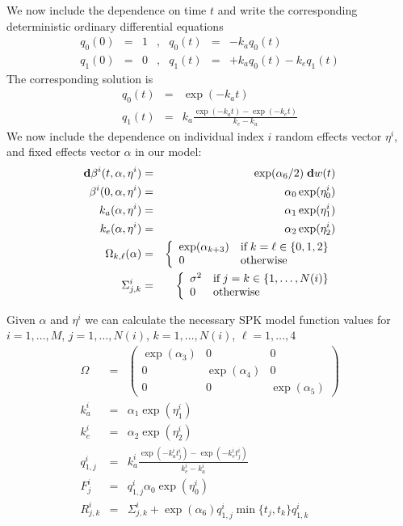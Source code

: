 \documentclass{article}
\newcommand{\Bd}{{\bf d}}
\begin{document}
\bigskip
\noindent
We now include the dependence on time \( t \) and write
the corresponding deterministic ordinary differential equations
\[
\begin{array}{rclcrcl}
q_0 (0) & = & 1 & , & q_0 (t) & = & -k_a q_0 (t) 
\\ 
q_1 (0) & = & 0   & ,  & q_1 (t) & = & +k_a q_0 (t) - k_e q_1 (t) 
\end{array}
\]
The corresponding solution is
\begin{eqnarray*}
q_0 (t)   & = & \exp( - k_a t ) \\
q_1 (t)   & = & k_a \frac{ \exp( - k_a t ) - \exp( -k_e t ) }{ k_e - k_a }
\end{eqnarray*}
We now include the dependence on individual index \( i \)
random effects vector \( \eta^i \),
and fixed effects vector \( \alpha \) in our model:
\begin{eqnarray*}
\Bd \beta^i (t, \alpha, \eta^i ) & = & 
	\exp( \alpha_6 / 2 ) \; \Bd w (t)  
\\
\beta^i (0, \alpha, \eta^i ) & = & 
	\alpha_0 \exp( \eta^i_0 )   
\\
k_a ( \alpha , \eta^i ) & = & 
	\alpha_1 \exp( \eta^i_1 ) 
\\
k_e ( \alpha , \eta^i ) & = & 
	\alpha_2 \exp( \eta^i_2 ) 
\\
\Omega_{k, \ell} ( \alpha ) & = & \left\{ \begin{array}{ll}
	\exp( \alpha_{k + 3} ) & \mbox{if} \; k = \ell \in \{ 0 , 1 , 2 \} 
	\\
	0                      & \mbox{otherwise}
\end{array} \right.
\\
\Sigma^i_{j, k} & = & \left\{ \begin{array}{ll}
	\sigma^2 & \mbox{if} \; j = k \in \{ 1 , \ldots , N(i) \} 
	\\
	0                      & \mbox{otherwise}
\end{array} \right.
\end{eqnarray*}

\bigskip
\noindent
Given \( \alpha \) and \( \eta^i \) we can calculate the necessary SPK model 
function values for 
\( i = 1 , \ldots , M \),
\( j = 1 , \ldots , N(i) \),
\( k = 1 , \ldots , N(i) \),
\( \ell = 1 , \ldots , 4 \)
\begin{eqnarray*}
\Omega & = & \left( \begin{array}{ccc}
	\exp( \alpha_3 ) & 0 & 0 \\
	0 & \exp( \alpha_4 ) & 0 \\
	0 & 0 & \exp( \alpha_5 ) 
\end{array} \right)
\\
k_a^i & = & \alpha_1 \exp( \eta^i_1 ) 
\\
k_e^i & = & \alpha_2 \exp( \eta^i_2 ) 
\\
q^i_{1,j} & = & 
	k_a^i 
		\frac{ \exp( - k_a^i t^i_j ) - \exp( -k_e^i t^i_j ) } 
			{ k_e^i - k_a^i }
\\
F^i_j & = & q^i_{1,j} \alpha_0 \exp( \eta^i_0 ) 
\\
R^i_{j,k} & = & 
	\Sigma_{j,k}^i +
		\exp( \alpha_6 ) q^i_{1,j} \min\{ t_j , t_k \}  q^i_{1,k} 
\end{eqnarray*}
\end{document}
